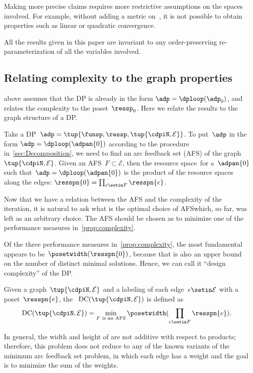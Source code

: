 \begin{remark}
    Making more precise claims requires more restrictive assumptions on the spaces involved.
    For example, without adding a metric on~\ressp, it is not possible to obtain properties such as linear or quadratic convergence.
\end{remark}

\begin{remark}
    All the results given in this paper are invariant to any order-preserving re-parameterization of all the variables involved.
\end{remark}

\subsection{Relating complexity to the graph properties}

 above assumes that the DP is already in the form $\adp=\dploop(\adp_{0})$, and relates the complexity to the poset~$\ressp_{0}$.
Here we relate the results to the graph structure of a DP.

Take a DP~$\adp=\tup{\funsp,\ressp, \tup{\cdpiN,\mathcal{E}} } $.
To put~$\adp$ in the form $\adp=\dploop(\adpan{0})$ according to the procedure in~\cref{sec:Decomposition}, we need to find an arc feedback set (AFS) of the graph~$\tup{\cdpiN,\mathcal{E}} $.
Given an AFS~$F\subset\mathcal{E}$, then the resource space~\ressp for a~$\adpan{0}$ such that~$\adp=\dploop(\adpan{0})$ is the product of the resource spaces along the edges: $\resspn{0}=\prod_{e\setin F}\resspn{e}$.

Now that we have a relation between the AFS and the complexity of the iteration, it is natural to ask what is the optimal choice of AFS\textemdash which, so far, was left as an arbitrary choice.
The AFS should be chosen as to minimize one of the performance measures in~\cref{prop:complexity}.

Of the three performance measures in~\cref{prop:complexity}, the most fundamental appears to be~$\posetwidth(\resspn{0})$, because that is also an upper bound on the number of distinct minimal solutions.
Hence, we can call it ``design complexity'' of the DP.
\begin{definition}
    \label{def:design-complexity}
    Given a graph~$\tup{\cdpiN,\mathcal{E}}$ and a labeling of each edge~$e\setin\mathcal{E}$ with a poset~$\resspn{e}$, the ~$\text{DC}(\tup{\cdpiN,\mathcal{E}} )$ is defined as
    \begin{equation}
        \text{DC}(\tup{\cdpiN,\mathcal{E}} )=\min_{F\text{ is an AFS}}\posetwidth(\prod_{e\setin F}\resspn{e}).
        \label{eq:complexity}
    \end{equation}
\end{definition}
In general, the width and height of  are not additive with respect to products; therefore, this problem does not reduce to any of the known variants of the minimum arc feedback set problem, in which each edge has a weight and the goal is to minimize the sum of the weights.

